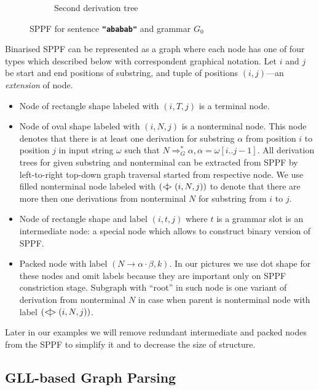 \begin{figure}[ht]
\begin{center}
\begin{subfigure}[b]{0.3\textwidth}
        \caption{Second derivation tree}
        \label{tree2}        
    \end{subfigure}
    \caption{SPPF for sentence \textbf{\texttt{"ababab"}} and grammar $G_0$}
    \label{sppfSample}
    \end{center}                
\end{figure}

Binarised SPPF can be represented as a graph where each node has one of four types which described below with correspondent graphical notation.
Let $i$ and $j$ be start and end positions of substring, and tuple of positions $(i,j)$---an \textit{extension} of node.

\begin{itemize}
    \item Node of rectangle shape labeled with $(i, T, j)$ is a terminal node.     
    \item Node of oval shape labeled with $(i, N, j)$ is a nonterminal node. 
    This node denotes that there is at least one derivation for substring $\alpha$ from position $i$ to position $j$ in input string $\omega$ such that $N \Rightarrow^*_G \alpha, \alpha = \omega[i..j-1] $.
    All derivation trees for given substring and nonterminal can be extracted from SPPF by left-to-right top-down graph traversal started from respective node. 
    We use filled nonterminal node labeled with $(<\mkern-11mu | \mkern-11mu> (i, N, j))$ to denote that there are more then one derivations from nonterminal $N$ for substring from $i$ to $j$.
    \item Node of rectangle shape and label $(i,t,j)$ where $t$ is a grammar slot is an intermediate node: a special node which allows to construct binary version of SPPF.
    \item Packed node with label $(N \rightarrow \alpha \cdot \beta, k)$. In our pictures we use dot shape for these nodes and omit labels because they are important only on SPPF constriction stage.
    Subgraph with ``root'' in such node is one variant of derivation from nonterminal $N$ in case when parent is nonterminal node with label $(<\mkern-9mu | \mkern-9mu> (i, N, j))$.

\end{itemize}

Later in our examples we will remove redundant intermediate and packed nodes from the SPPF to simplify it and to decrease the size of structure.

\subsection{GLL-based Graph Parsing}

